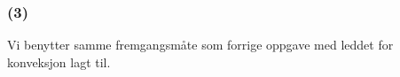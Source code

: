 \subsubsection{(3)}

Vi benytter samme fremgangsmåte som forrige oppgave med leddet for konveksjon lagt til.

\begin{figure}[H]
\centering

\caption{}
\end{figure}

\newpage




\newpage